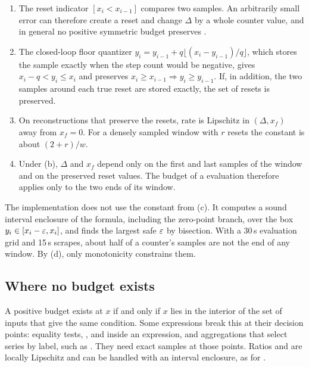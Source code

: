 \begin{proposition}
\label{prop:rate}
\leavevmode
\begin{enumerate}
  \item[(a)] The reset indicator $[x_i < x_{i-1}]$ compares two samples. An
    arbitrarily small error can therefore create a reset and change
    $\Delta$ by a whole counter value, and in general no positive
    symmetric budget preserves .
  \item[(b)] The closed-loop floor quantizer
    $y_i = y_{i-1} + q\lfloor (x_i - y_{i-1})/q\rfloor$, which stores the
    sample exactly when the step count would be negative, gives
    $x_i - q < y_i \le x_i$ and preserves
    $x_i \ge x_{i-1} \Rightarrow y_i \ge y_{i-1}$. If, in addition, the two
    samples around each true reset are stored exactly, the set of resets
    is preserved.
  \item[(c)] On reconstructions that preserve the resets, $\mathrm{rate}$ is
    Lipschitz in $(\Delta, x_f)$ away from $x_f = 0$. For a densely
    sampled window with $r$ resets the constant is about $(2 + r)/w$.
  \item[(d)] Under (b), $\Delta$ and $x_f$ depend only on the first and last
    samples of the window and on the preserved reset values. The budget
    of a  evaluation therefore applies only to the two ends of
    its window.
\end{enumerate}
\end{proposition}

The implementation does not use the constant from (c). It computes a
sound interval enclosure of the  formula, including the
zero-point branch, over the box $y_i \in [x_i - \varepsilon, x_i]$, and finds the
largest safe $\varepsilon$ by bisection. With a 30\,s evaluation grid and 15\,s
scrapes, about half of a counter's samples are not the end of any window.
By (d), only monotonicity constrains them.

\subsection{Where no budget exists}

A positive budget exists at $x$ if and only if $x$ lies in the interior of
the set of inputs that give the same condition. Some expressions break this
at their decision points: equality tests, , 
and  inside an expression, and aggregations that select series
by label, such as . They need exact samples at those points.
Ratios and  are locally Lipschitz and can be
handled with an interval enclosure, as for .

